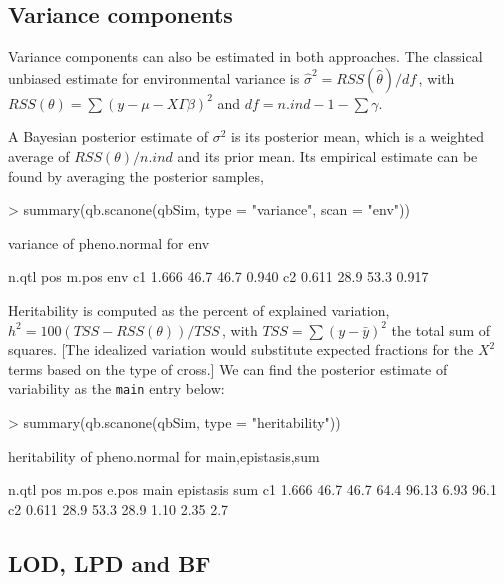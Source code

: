\documentclass[12pt]{article}
\begin{document}
\subsection{Variance components}

Variance components can also be estimated in both approaches. The
classical unbiased estimate for environmental variance is
$\hat{\sigma}^2=RSS(\hat{\theta})/df$\,, with 
$RSS(\theta)=\sum(y-\mu-X\Gamma\beta)^2$ and 
$df = n.ind - 1 - \sum\gamma$.

A Bayesian posterior estimate of $\sigma^2$ is its posterior mean,
which is a weighted average of $RSS(\theta)/n.ind$ and its prior mean. Its
empirical estimate can be found by averaging the posterior samples,

\begin{Schunk}
\begin{Sinput}
> summary(qb.scanone(qbSim, type = "variance", scan = "env"))
\end{Sinput}
\begin{Soutput}
variance of pheno.normal for env 

   n.qtl  pos m.pos   env
c1 1.666 46.7  46.7 0.940
c2 0.611 28.9  53.3 0.917
\end{Soutput}
\end{Schunk}

Heritability is computed as the percent of explained variation,
$h^2 = 100 (TSS-RSS(\theta))/TSS$\,,
with $TSS=\sum(y-\bar{y})^2$ the total sum of squares.
[The idealized variation would substitute expected fractions for the
$X^2$ terms based on the type of cross.] We can find the posterior
estimate of variability as the {\tt main} entry below:

\begin{Schunk}
\begin{Sinput}
> summary(qb.scanone(qbSim, type = "heritability"))
\end{Sinput}
\begin{Soutput}
heritability of pheno.normal for main,epistasis,sum 

   n.qtl  pos m.pos e.pos  main epistasis  sum
c1 1.666 46.7  46.7  64.4 96.13      6.93 96.1
c2 0.611 28.9  53.3  28.9  1.10      2.35  2.7
\end{Soutput}
\end{Schunk}

\subsection{LOD, LPD and BF}
\end{document}
